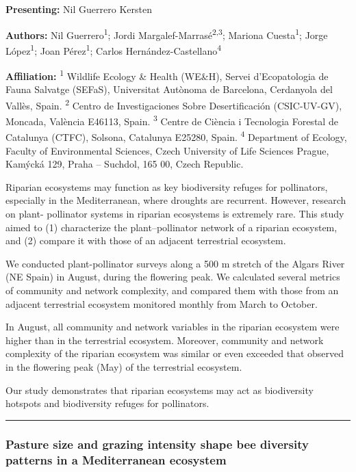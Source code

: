 \documentclass[
  letterpaper,
  DIV=11,
  numbers=noendperiod]{scrartcl}
\begin{document}
\textbf{Presenting:} Nil Guerrero Kersten

\textbf{Authors:} Nil Guerrero\textsuperscript{1}; Jordi
Margalef-Marrasé\textsuperscript{2,3}; Mariona
Cuesta\textsuperscript{1}; Jorge López\textsuperscript{1}; Joan
Pérez\textsuperscript{1}; Carlos Hernández-Castellano\textsuperscript{4}

\textbf{Affiliation:} \textsuperscript{1} Wildlife Ecology \& Health
(WE\&H), Servei d'Ecopatologia de Fauna Salvatge (SEFaS), Universitat
Autònoma de Barcelona, Cerdanyola del Vallès, Spain. \textsuperscript{2}
Centro de Investigaciones Sobre Desertificación (CSIC-UV-GV), Moncada,
València E46113, Spain. \textsuperscript{3} Centre de Ciència i
Tecnologia Forestal de Catalunya (CTFC), Solsona, Catalunya E25280,
Spain. \textsuperscript{4} Department of Ecology, Faculty of
Environmental Sciences, Czech University of Life Sciences Prague,
Kamýcká 129, Praha -- Suchdol, 165 00, Czech Republic.

Riparian ecosystems may function as key biodiversity refuges for
pollinators, especially in the Mediterranean, where droughts are
recurrent. However, research on plant- pollinator systems in riparian
ecosystems is extremely rare. This study aimed to (1) characterize the
plant--pollinator network of a riparian ecosystem, and (2) compare it
with those of an adjacent terrestrial ecosystem.

We conducted plant-pollinator surveys along a 500 m stretch of the
Algars River (NE Spain) in August, during the flowering peak. We
calculated several metrics of community and network complexity, and
compared them with those from an adjacent terrestrial ecosystem
monitored monthly from March to October.

In August, all community and network variables in the riparian ecosystem
were higher than in the terrestrial ecosystem. Moreover, community and
network complexity of the riparian ecosystem was similar or even
exceeded that observed in the flowering peak (May) of the terrestrial
ecosystem.

Our study demonstrates that riparian ecosystems may act as biodiversity
hotspots and biodiversity refuges for pollinators.

\begin{center}\rule{0.5\linewidth}{0.5pt}\end{center}

\subsubsection{Pasture size and grazing intensity shape bee diversity
patterns in a Mediterranean
ecosystem}\label{pasture-size-and-grazing-intensity-shape-bee-diversity-patterns-in-a-mediterranean-ecosystem}
\end{document}
